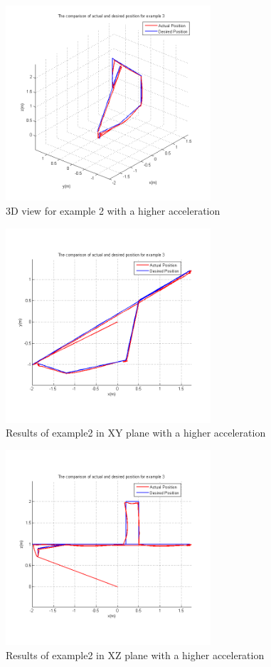 \begin{figure}[H]
  \centering
  \includegraphics[width=3in]{Ex2_3_3D.png}
  \caption{3D view for example 2 with a higher acceleration}
\end{figure}

\begin{figure}[H]
  \centering
  \includegraphics[width=3in]{Ex2_3_XY.PNG}
  \caption{Results of example2 in XY plane with a higher acceleration}
\end{figure}

\begin{figure}[H]
  \centering
  \includegraphics[width=3in]{Ex2_3_XZ.PNG}
  \caption{Results of example2 in XZ plane with a higher acceleration}
\end{figure}

